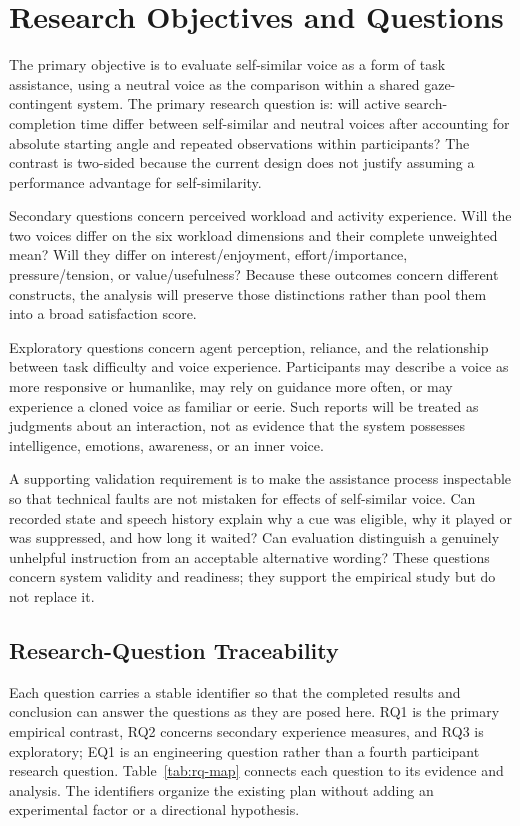 \section{Research Objectives and Questions}
The primary objective is to evaluate self-similar voice as a form of task assistance, using a neutral voice as the comparison within a shared gaze-contingent system. The primary research question is: will active search-completion time differ between self-similar and neutral voices after accounting for absolute starting angle and repeated observations within participants? The contrast is two-sided because the current design does not justify assuming a performance advantage for self-similarity.

Secondary questions concern perceived workload and activity experience. Will the two voices differ on the six workload dimensions and their complete unweighted mean? Will they differ on interest/enjoyment, effort/importance, pressure/tension, or value/usefulness? Because these outcomes concern different constructs, the analysis will preserve those distinctions rather than pool them into a broad satisfaction score.

Exploratory questions concern agent perception, reliance, and the relationship between task difficulty and voice experience. Participants may describe a voice as more responsive or humanlike, may rely on guidance more often, or may experience a cloned voice as familiar or eerie. Such reports will be treated as judgments about an interaction, not as evidence that the system possesses intelligence, emotions, awareness, or an inner voice.

A supporting validation requirement is to make the assistance process inspectable so that technical faults are not mistaken for effects of self-similar voice. Can recorded state and speech history explain why a cue was eligible, why it played or was suppressed, and how long it waited? Can evaluation distinguish a genuinely unhelpful instruction from an acceptable alternative wording? These questions concern system validity and readiness; they support the empirical study but do not replace it.


\subsection{Research-Question Traceability}
Each question carries a stable identifier so that the completed results and conclusion can answer the questions as they are posed here. RQ1 is the primary empirical contrast, RQ2 concerns secondary experience measures, and RQ3 is exploratory; EQ1 is an engineering question rather than a fourth participant research question. Table~\ref{tab:rq-map} connects each question to its evidence and analysis. The identifiers organize the existing plan without adding an experimental factor or a directional hypothesis.

